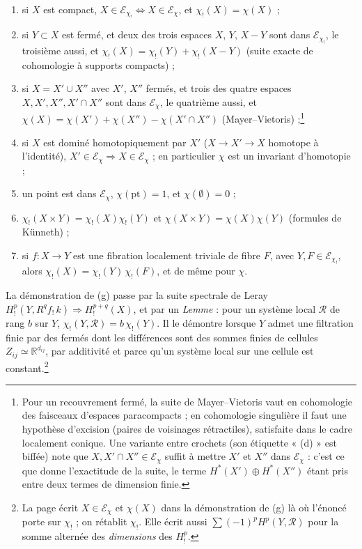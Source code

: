 \documentclass[11pt,a4paper]{article}
\begin{document}
\begin{enumerate}
  \item[(a)] si $X$ est compact, $X \in \mathcal{E}_{\chi_!} \Leftrightarrow
  X \in \mathcal{E}_\chi$, et $\chi_!(X) = \chi(X)$ ;
  \item[(b)] si $Y \subset X$ est fermé, et deux des trois espaces $X$, $Y$,
  $X - Y$ sont dans $\mathcal{E}_{\chi_!}$, le troisième aussi, et
  $\chi_!(X) = \chi_!(Y) + \chi_!(X - Y)$ (suite exacte de cohomologie à
  supports compacts) ;
  \item[(c)] si $X = X' \cup X''$ avec $X'$, $X''$ fermés, et trois des quatre
  espaces $X, X', X'', X' \cap X''$ sont dans $\mathcal{E}_\chi$, le quatrième
  aussi, et $\chi(X) = \chi(X') + \chi(X'') - \chi(X' \cap X'')$
  (Mayer--Vietoris) ;\footnote{Pour un recouvrement fermé, la suite de
  Mayer--Vietoris vaut en cohomologie des faisceaux d'espaces paracompacts ;
  en cohomologie singulière il faut une hypothèse d'excision (paires de
  voisinages rétractiles), satisfaite dans le cadre localement conique. Une
  variante entre crochets (son étiquette « (d) » est biffée) note que
  $X, X' \cap X'' \in \mathcal{E}_\chi$ suffit à mettre $X'$ et $X''$ dans
  $\mathcal{E}_\chi$ : c'est ce que donne l'exactitude de la suite, le terme
  $H^*(X') \oplus H^*(X'')$ étant pris entre deux termes de dimension
  finie.}
  \item[(d)] si $X$ est dominé homotopiquement par $X'$ ($X \to X' \to X$
  homotope à l'identité), $X' \in \mathcal{E}_\chi \Rightarrow X \in
  \mathcal{E}_\chi$ ; en particulier $\chi$ est un invariant d'homotopie ;
  \item[(e)] un point est dans $\mathcal{E}_\chi$, $\chi(\mathrm{pt}) = 1$, et
  $\chi(\emptyset) = 0$ ;
  \item[(f)] $\chi_!(X \times Y) = \chi_!(X)\chi_!(Y)$ et
  $\chi(X \times Y) = \chi(X)\chi(Y)$ (formules de Künneth) ;
  \item[(g)] si $f : X \to Y$ est une fibration localement triviale de fibre
  $F$, avec $Y, F \in \mathcal{E}_{\chi_!}$, alors
  $\chi_!(X) = \chi_!(Y)\,\chi_!(F)$, et de même pour $\chi$.
\end{enumerate}
La démonstration de (g) passe par la suite spectrale de Leray
$H^p_!(Y, R^q f_!\,k) \Rightarrow H^{p+q}_!(X)$, et par un \emph{Lemme} : pour
un système local $\mathcal{R}$ de rang $b$ sur $Y$, $\chi_!(Y, \mathcal{R}) =
b\,\chi_!(Y)$. Il le démontre lorsque $Y$ admet une filtration finie par des
fermés dont les différences sont des sommes finies de cellules
$Z_{ij} \simeq \mathbb{R}^{d_{ij}}$, par additivité et parce qu'un système local
sur une cellule est constant.\footnote{La page écrit $X \in \mathcal{E}_\chi$
et $\chi(X)$ dans la démonstration de (g) là où l'énoncé porte sur
$\chi_!$ ; on rétablit $\chi_!$. Elle écrit aussi $\sum (-1)^p H^p(Y,
\mathcal{R})$ pour la somme alternée des \emph{dimensions} des $H^p_!$.}
\end{document}
